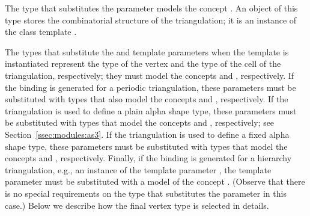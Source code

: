 The type that substitutes the  parameter models the concept
. An object of this type stores the combinatorial structure of the triangulation; it is an instance of the class template .

The types that substitute the  and  template parameters when the template  is instantiated represent the type of the vertex and the type of the cell of the triangulation, respectively; they must model the concepts  and , respectively. If the binding is generated for a periodic triangulation, these parameters must be substituted with types that also model the concepts  and , respectively. If the triangulation is used to define a plain alpha shape type, these parameters must be substituted with types that model the concepts  and , respectively; see Section~\ref{ssec:modules:as3}. If the triangulation is used to define a fixed alpha shape type, these parameters must be substituted with types that model the concepts  and , respectively. Finally, if the binding is generated for a hierarchy triangulation, e.g., an instance of the template parameter , the  template parameter must be substituted with a model of the concept
. (Observe that there is no special requirements on the type that substitutes the  parameter in this case.) Below we describe how the final vertex type is selected in details.

